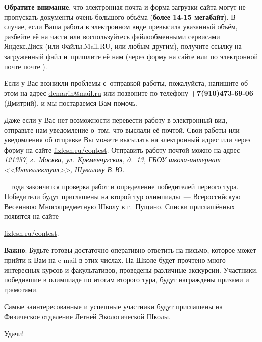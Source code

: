 \documentclass[a4paper,12pt]{article}
\begin{document}
\textbf{Обратите внимание}, что электронная почта и форма загрузки сайта могут не пропускать
документы очень большого объёма (\textbf{более 14-15 мегабайт}). В случае, если Ваша работа в электронном
виде превысила указанный объём, разбейте её на части или воспользуйтесь файлообменными сервисами
Яндекс.Диск (или Файлы.Mail.RU, или любым другим), получите ссылку на загруженный файл
и~пришлите её нам (через форму на сайте или по электронной почте почте \href{mailto:\olympmail}{\olympmail}).

Если у Вас возникли проблемы с~отправкой работы, пожалуйста, напишите об этом на адрес
\href{mailto:demarin@mail.ru}{demarin@mail.ru} или позвоните по телефону
\textbf{+7(910)473-69-06} (Дмитрий), и мы постараемся Вам помочь.

Даже если у Вас нет возможности перевести работу в электронный вид, отправьте нам уведомление
о~том, что выслали её почтой. Свои работы или уведомления об отправке Вы можете высылать
на электронный адрес \href{mailto:\olympmail}{\olympmail}
или через форму на сайте \href{http://fizlesh.ru/contest}{fizlesh.ru/contest}.
Отправить работу почтой можно на адрес \emph{121357, г.~Москва, ул.~Кременчугская, д.~13, ГБОУ школа-интернат
<<Интеллектуал>>, Шувалову В.\,Ю.}

\bigskip


\olympcheckend~\olympyearend~года закончится проверка работ и определение победителей первого тура.
Победители будут приглашены на второй тур олимпиады~--- Всероссийскую Весеннюю Многопредметную Школу
в г.~Пущино. Списки приглашённых появятся на сайте\\
\centerline{\href{http://fizlesh.ru/contest}{fizlesh.ru/contest}.}
\textbf{Важно}: Будьте готовы достаточно оперативно ответить на письмо, которое может
прийти к Вам на e-mail в этих числах.
На Школе будет прочтено много интересных курсов и факультативов, проведены различные экскурсии.
Участники, победившие в олимпиаде по итогам второго тура, будут награждены призами и грамотами.

Самые заинтересованные и успешные участники будут приглашены
на Физическое отделение Летней Экологической Школы.

\bigskip

Удачи!
\end{document}
